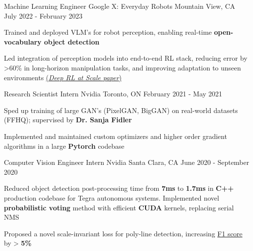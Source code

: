 \begin{cventries}
  \cventry
    {Machine Learning Engineer} %
    {Google X: Everyday Robots} %
    {Mountain View, CA} %
    {July 2022 - February 2023} %
    {
      \begin{cvitems} %
        \item {Trained and deployed VLM's for robot perception, enabling real-time \textbf{open-vocabulary object detection}}
        \item {Led integration of perception models into end-to-end RL stack, reducing error by >60\% in long-horizon manipulation tasks, and improving adaptation to unseen environments \href{https://rl-at-scale.github.io/}{(\underline{\textit{Deep RL at Scale paper}})}}
      \end{cvitems}
    }

  \cventry
    {Research Scientist Intern} %
    {Nvidia} %
    {Toronto, ON} %
    {February 2021 - May 2021} %
    {
      \begin{cvitems} %
        \item {Sped up training of large GAN's (PixelGAN, BigGAN) on real-world datasets (FFHQ); supervised by \textbf{Dr. Sanja Fidler}}
        \item {Implemented and maintained custom optimizers and higher order gradient algorithms in a large \textbf{Pytorch} codebase}
      \end{cvitems}
    }
  
  \cventry
    {Computer Vision Engineer Intern} %
    {Nvidia} %
    {Santa Clara, CA} %
    {June 2020 - September 2020} %
    {
      \begin{cvitems} %
        \item {Reduced object detection post-processing time from \textbf{7ms}
        to \textbf{1.7ms} in \textbf{C++} production codebase for Tegra
        autonomous systems. Implemented novel \textbf{probabilistic voting}
        method with efficient \textbf{CUDA} kernels, replacing serial NMS}
        \item {Proposed a novel scale-invariant loss for poly-line detection, increasing \underline{F1 score} by > \textbf{5\%}}
      \end{cvitems}
    }


\end{cventries}
